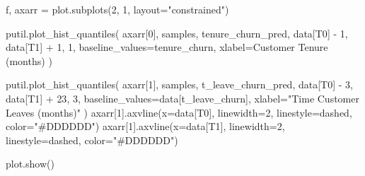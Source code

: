 \documentclass[
  letterpaper,
  DIV=11,
  numbers=noendperiod]{scrartcl}
\newenvironment{Shaded}{\begin{snugshade}}{\end{snugshade}}
\newcommand{\DecValTok}[1]{\textcolor[rgb]{0.68,0.00,0.00}{#1}}
\newcommand{\NormalTok}[1]{\textcolor[rgb]{0.00,0.23,0.31}{#1}}
\newcommand{\OperatorTok}[1]{\textcolor[rgb]{0.37,0.37,0.37}{#1}}
\newcommand{\StringTok}[1]{\textcolor[rgb]{0.13,0.47,0.30}{#1}}
\begin{document}
\begin{Shaded}
\begin{Highlighting}[]
\NormalTok{f, axarr }\OperatorTok{=}\NormalTok{ plot.subplots(}\DecValTok{2}\NormalTok{, }\DecValTok{1}\NormalTok{, layout}\OperatorTok{=}\StringTok{"constrained"}\NormalTok{)}

\NormalTok{putil.plot\_hist\_quantiles(}
\NormalTok{  axarr[}\DecValTok{0}\NormalTok{], samples, }\StringTok{\textquotesingle{}tenure\_churn\_pred\textquotesingle{}}\NormalTok{,}
\NormalTok{  data[}\StringTok{\textquotesingle{}T0\textquotesingle{}}\NormalTok{] }\OperatorTok{{-}} \DecValTok{1}\NormalTok{, data[}\StringTok{\textquotesingle{}T1\textquotesingle{}}\NormalTok{] }\OperatorTok{+} \DecValTok{1}\NormalTok{, }\DecValTok{1}\NormalTok{,}
\NormalTok{  baseline\_values}\OperatorTok{=}\NormalTok{tenure\_churn,}
\NormalTok{  xlabel}\OperatorTok{=}\StringTok{\textquotesingle{}Customer Tenure (months)\textquotesingle{}}
\NormalTok{)}


\NormalTok{putil.plot\_hist\_quantiles(}
\NormalTok{  axarr[}\DecValTok{1}\NormalTok{], samples, }\StringTok{\textquotesingle{}t\_leave\_churn\_pred\textquotesingle{}}\NormalTok{,}
\NormalTok{  data[}\StringTok{\textquotesingle{}T0\textquotesingle{}}\NormalTok{] }\OperatorTok{{-}} \DecValTok{3}\NormalTok{, data[}\StringTok{\textquotesingle{}T1\textquotesingle{}}\NormalTok{] }\OperatorTok{+} \DecValTok{23}\NormalTok{, }\DecValTok{3}\NormalTok{,}
\NormalTok{  baseline\_values}\OperatorTok{=}\NormalTok{data[}\StringTok{\textquotesingle{}t\_leave\_churn\textquotesingle{}}\NormalTok{],}
\NormalTok{  xlabel}\OperatorTok{=}\StringTok{"Time Customer Leaves (months)"}
\NormalTok{)}
\NormalTok{axarr[}\DecValTok{1}\NormalTok{].axvline(x}\OperatorTok{=}\NormalTok{data[}\StringTok{\textquotesingle{}T0\textquotesingle{}}\NormalTok{], linewidth}\OperatorTok{=}\DecValTok{2}\NormalTok{,}
\NormalTok{                 linestyle}\OperatorTok{=}\StringTok{\textquotesingle{}dashed\textquotesingle{}}\NormalTok{, color}\OperatorTok{=}\StringTok{"\#DDDDDD"}\NormalTok{)}
\NormalTok{axarr[}\DecValTok{1}\NormalTok{].axvline(x}\OperatorTok{=}\NormalTok{data[}\StringTok{\textquotesingle{}T1\textquotesingle{}}\NormalTok{], linewidth}\OperatorTok{=}\DecValTok{2}\NormalTok{,}
\NormalTok{                 linestyle}\OperatorTok{=}\StringTok{\textquotesingle{}dashed\textquotesingle{}}\NormalTok{, color}\OperatorTok{=}\StringTok{"\#DDDDDD"}\NormalTok{)}

\NormalTok{plot.show()}
\end{Highlighting}
\end{Shaded}
\end{document}
